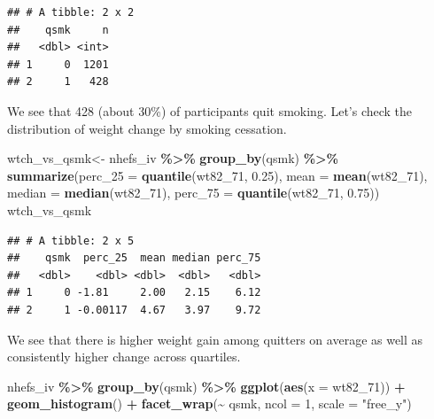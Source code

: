 \documentclass[
]{book}
\newenvironment{Shaded}{\begin{snugshade}}{\end{snugshade}}
\newcommand{\AttributeTok}[1]{\textcolor[rgb]{0.13,0.29,0.53}{#1}}
\newcommand{\DecValTok}[1]{\textcolor[rgb]{0.00,0.00,0.81}{#1}}
\newcommand{\FloatTok}[1]{\textcolor[rgb]{0.00,0.00,0.81}{#1}}
\newcommand{\FunctionTok}[1]{\textcolor[rgb]{0.13,0.29,0.53}{\textbf{#1}}}
\newcommand{\NormalTok}[1]{#1}
\newcommand{\OtherTok}[1]{\textcolor[rgb]{0.56,0.35,0.01}{#1}}
\newcommand{\SpecialCharTok}[1]{\textcolor[rgb]{0.81,0.36,0.00}{\textbf{#1}}}
\newcommand{\StringTok}[1]{\textcolor[rgb]{0.31,0.60,0.02}{#1}}
\begin{document}
\begin{verbatim}
## # A tibble: 2 x 2
##    qsmk     n
##   <dbl> <int>
## 1     0  1201
## 2     1   428
\end{verbatim}

We see that 428 (about 30\%) of participants quit smoking. Let's check the distribution of weight change by smoking cessation.

\begin{Shaded}
\begin{Highlighting}[]
\NormalTok{wtch\_vs\_qsmk}\OtherTok{\textless{}{-}}\NormalTok{ nhefs\_iv }\SpecialCharTok{\%\textgreater{}\%} 
  \FunctionTok{group\_by}\NormalTok{(qsmk) }\SpecialCharTok{\%\textgreater{}\%} 
  \FunctionTok{summarize}\NormalTok{(}\AttributeTok{perc\_25 =} \FunctionTok{quantile}\NormalTok{(wt82\_71, }\FloatTok{0.25}\NormalTok{), }
            \AttributeTok{mean =} \FunctionTok{mean}\NormalTok{(wt82\_71), }
            \AttributeTok{median =} \FunctionTok{median}\NormalTok{(wt82\_71),}
            \AttributeTok{perc\_75 =} \FunctionTok{quantile}\NormalTok{(wt82\_71, }\FloatTok{0.75}\NormalTok{))}
\NormalTok{wtch\_vs\_qsmk}
\end{Highlighting}
\end{Shaded}

\begin{verbatim}
## # A tibble: 2 x 5
##    qsmk  perc_25  mean median perc_75
##   <dbl>    <dbl> <dbl>  <dbl>   <dbl>
## 1     0 -1.81     2.00   2.15    6.12
## 2     1 -0.00117  4.67   3.97    9.72
\end{verbatim}

We see that there is higher weight gain among quitters on average as well as consistently higher change across quartiles.

\begin{Shaded}
\begin{Highlighting}[]
\NormalTok{nhefs\_iv }\SpecialCharTok{\%\textgreater{}\%} 
  \FunctionTok{group\_by}\NormalTok{(qsmk) }\SpecialCharTok{\%\textgreater{}\%}
  \FunctionTok{ggplot}\NormalTok{(}\FunctionTok{aes}\NormalTok{(}\AttributeTok{x =}\NormalTok{ wt82\_71)) }\SpecialCharTok{+} 
  \FunctionTok{geom\_histogram}\NormalTok{() }\SpecialCharTok{+} 
  \FunctionTok{facet\_wrap}\NormalTok{(}\SpecialCharTok{\textasciitilde{}}\NormalTok{ qsmk, }\AttributeTok{ncol =} \DecValTok{1}\NormalTok{, }\AttributeTok{scale =} \StringTok{"free\_y"}\NormalTok{)}
\end{Highlighting}
\end{Shaded}
\end{document}
